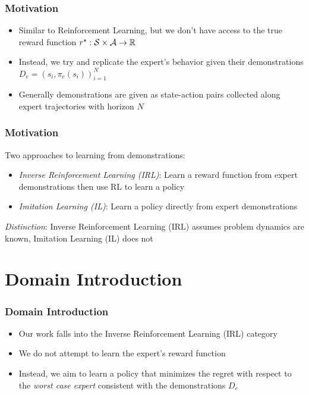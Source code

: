 \documentclass{beamer}
\begin{document}
\begin{frame}
\frametitle{Motivation}
	\begin{itemize}
		\item Similar to Reinforcement Learning, but we don't have access to the true reward function $r^\star : \mathcal{S} \times \mathcal{A} \to \mathbb{R}$
		\item Instead, we try and replicate the expert's behavior given their demonstrations $D_e = (s_i, \pi_e(s_i))_{i=1}^N$
		\item Generally demonstrations are given as state-action pairs collected along expert trajectories with horizon $N$
	\end{itemize}
\end{frame}

\begin{frame}
\frametitle{Motivation}
Two approaches to learning from demonstrations:
\begin{itemize}
	\item \emph{Inverse Reinforcement Learning (IRL)}: Learn a reward function from expert demonstrations then use RL to learn a policy
	\item \emph{Imitation Learning (IL)}: Learn a policy directly from expert demonstrations
\end{itemize}
	\emph{Distinction}: Inverse Reinforcement Learning (IRL) assumes problem dynamics are known, Imitation Learning (IL) does not
\end{frame}

\section*{Domain Introduction}

\begin{frame}
\frametitle{Domain Introduction}
	\begin{itemize}
		\item Our work falls into the Inverse Reinforcement Learning (IRL) category
		\item We do not attempt to learn the expert's reward function
		\item Instead, we aim to learn a policy that minimizes the regret with respect to the \emph{worst case expert} consistent with the demonstrations $D_e$
	\end{itemize}
\end{frame}
\end{document}
